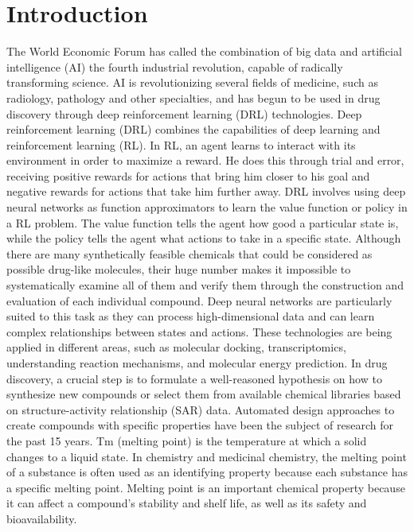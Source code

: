 \documentclass[a4paper]{article}
\begin{document}
\section{Introduction}\label{sec:intro}

The World Economic Forum has called the combination of big data and artificial intelligence (AI) the fourth industrial revolution, capable of radically transforming science. AI is revolutionizing several fields of medicine, such as radiology, pathology and other specialties, and has begun to be used in drug discovery through deep reinforcement learning (DRL) technologies. 
Deep reinforcement learning (DRL) combines the capabilities of deep learning and reinforcement learning (RL). In RL, an agent learns to interact with its environment in order to maximize a reward. He does this through trial and error, receiving positive rewards for actions that bring him closer to his goal and negative rewards for actions that take him further away. DRL involves using deep neural networks as function approximators to learn the value function or policy in a RL problem. The value function tells the agent how good a particular state is, while the policy tells the agent what actions to take in a specific state. Although there are many synthetically feasible chemicals that could be considered as possible drug-like molecules, their huge number makes it impossible to systematically examine all of them and verify them through the construction and evaluation of each individual compound. Deep neural networks are particularly suited to this task as they can process high-dimensional data and can learn complex relationships between states and actions. These technologies are being applied in different areas, such as molecular docking, transcriptomics, understanding reaction mechanisms, and molecular energy prediction.
In drug discovery, a crucial step is to formulate a well-reasoned hypothesis on how to synthesize new compounds or select them from available chemical libraries based on structure-activity relationship (SAR) data. Automated design approaches to create compounds with specific properties have been the subject of research for the past 15 years. 
Tm (melting point) is the temperature at which a solid changes to a liquid state. In chemistry and medicinal chemistry, the melting point of a substance is often used as an identifying property because each substance has a specific melting point. Melting point is an important chemical property because it can affect a compound's stability and shelf life, as well as its safety and bioavailability.
\end{document}
